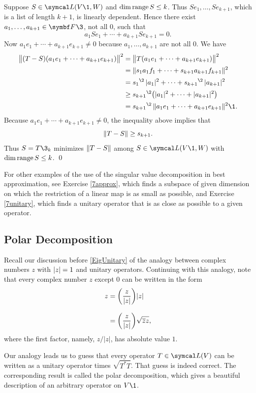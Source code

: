 Suppose $S \in \L(V\1,W)$ and $\dim \operatorname{range} S \le k$. Thus $Se_1, \ldots, Se_{k+1}$, which is a list of length $k+1$, is linearly dependent. Hence there exist $a_1, \ldots, a_{k+1} \in \F{}\3$, not all $0$, such that
\[
a_1 Se_1 + \cdots + a_{k+1} Se_{k+1} = 0.
\]
Now $a_1 e_1 + \cdots + a_{k+1} e_{k+1} \ne 0$ because $a_1, \ldots, a_{k+1}$ are not all $0$. We have
\begin{align*}
\norm[\big]{ (T - S)(a_1 e_1 + \cdots + a_{k+1} e_{k+1}) }^2 &= \norm[\big]{ T(a_1 e_1 + \cdots + a_{k+1} e_{k+1}) }^2 \\[1bp]
&= \norm{ s_1 a_1 f_1 + \cdots + s_{k+1} a_{k+1} f_{k+1}}^2 \\[1bp]
&= {s_1}^{\2} \, \abs{a_1}^2 + \cdots + {s_{k+1}}^{\2} \,\abs{a_{k+1}}^2 \\[1bp]
&\ge {s_{k+1}}^{\2} \paren[\big]{ \abs{a_1}^2 + \cdots + \abs{a_{k+1}}^2 } \\[1bp]
&= {s_{k+1}}^{\2} \,\norm{a_1 e_1 + \cdots + a_{k+1} e_{k+1}}^2\1.
\end{align*}
Because $a_1 e_1 + \cdots + a_{k+1} e_{k+1} \ne 0$, the inequality above implies that
\[
\lVert T-S\rVert \ge s_{k+1}.
\]
Thus $S = T\3_k$ minimizes $\lVert T-S\rVert$ among $S\in\L(V\1,W)$ with $\dim \operatorname{range} S \le k$.
\qed

For other examples of the use of the singular value decomposition in best approximation, see Exercise \ref{7approx}, which finds a subspace of given dimension on which the restriction of a linear map is as small as possible, and Exercise \ref{7unitary}, which finds a unitary operator that is as close as possible to a given operator.

\pagebreak[3]

\subsection{Polar Decomposition}

Recall our discussion before \ref{EigUnitary} of the analogy between complex numbers $z$ with $\lvert z\rvert = 1$ and unitary operators. Continuing with this analogy, note that every complex number $z$ except $0$ can
be written in the form
\begin{align*}
z &= \paren[\bigg]{ \frac{z}{|z|} } |z| \\[8bp]
&= \paren[\bigg]{ \frac{z}{|z|} } \sqrt{\bar{z} z},
\end{align*}
where the first factor, namely, $z/|z|$, has absolute value $1$.

Our analogy leads us to guess that every operator $T \in \L(V)$ can be written as a unitary operator times $ \sqrt{T^* T}$.  That guess is indeed correct. The corresponding result is called the polar decomposition, which gives a beautiful description of an arbitrary operator on $V\1$.

